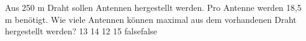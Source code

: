     {Aus 250 m Draht sollen Antennen hergestellt werden. Pro Antenne werden 18,5 m benötigt. Wie viele Antennen können maximal aus dem vorhandenen Draht hergestellt werden?}
    {13}
    {14}
    {12}
    {15}
    {false}{false}